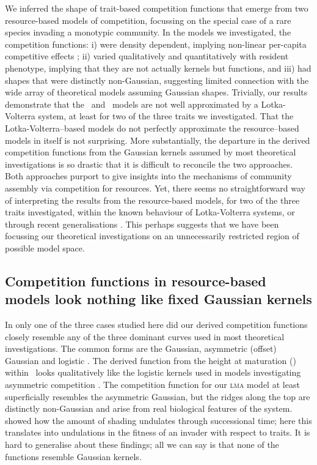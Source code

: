 \documentclass[a4paper,11pt]{article}
\begin{document}
We inferred the shape of trait-based competition functions that emerge
from two resource-based models of competition, focussing on the
special case of a rare species invading a monotypic community.
%
In the models we investigated, the competition functions: i) were
density dependent, implying non-linear per-capita competitive effects
\citep{Abrams-1980}; ii) varied qualitatively and quantitatively with
resident phenotype,
implying that they are not actually kernels but functions,
%
and iii) had shapes that were distinctly non-Gaussian, suggesting
limited connection with the wide array of theoretical models assuming
Gaussian shapes.
%
Trivially, our results demonstrate that the \Rstar\ and \plant\ models
are not well approximated by a Lotka-Volterra system, at least for two
of the three traits we investigated. That the Lotka-Volterra--based
models do not perfectly approximate the resource--based models in
itself is not surprising.
%
More substantially, the departure in the derived competition functions
from the Gaussian kernels assumed by most theoretical investigations
is so drastic that it is difficult to reconcile the two approaches.
Both approaches purport to give insights into the mechanisms of
community assembly via competition for resources.  Yet, there seems no
straightforward way of interpreting the results from the
resource-based models, for two of the three traits investigated,
within the known behaviour of Lotka-Volterra systems, or through
recent generalisations \citep{Leimar-2013}. This perhaps suggests that
we have been focussing our theoretical investigations on an
unnecessarily restricted region of possible model space.

\subsection{Competition functions in resource-based models look nothing like
fixed Gaussian kernels}

In only one of the three cases studied here did our derived
competition functions closely resemble any of the three dominant
curves used in most theoretical investigations. The common forms are
the Gaussian, asymmetric (offset) Gaussian \citep{Roughgarden-1979}
and logistic \citep[e.g.][]{Kisdi-1999, Law-1997}.  The derived
function from the height at maturation (\hmat) within \plant\ looks
qualitatively like the logistic kernels used in models investigating
asymmetric competition \citep{Law-1997, Geritz-1999, Kisdi-1999,
  Calcagno-2006}. The competition function for our \textsc{lma} model
at least superficially resembles the asymmetric Gaussian, but the
ridges along the top are distinctly non-Gaussian and arise from real
biological features of the system.
%
\citet{Falster-2011} showed how the amount of shading undulates
through successional time; here this translates into undulations in
the fitness of an invader with respect to traits. 
%
It is hard to generalise about these findings; all we can say is that
none of the functions resemble Gaussian kernels.
\end{document}
